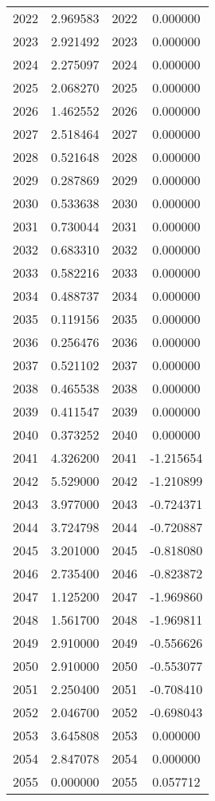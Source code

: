 \documentclass[12pt]{article}
\begin{document}
\begin{longtable}{@{}cccc@{}}
2022 & 2.969583 & 2022 & 0.000000 \\
2023 & 2.921492 & 2023 & 0.000000 \\
2024 & 2.275097 & 2024 & 0.000000 \\
2025 & 2.068270 & 2025 & 0.000000 \\
2026 & 1.462552 & 2026 & 0.000000 \\
2027 & 2.518464 & 2027 & 0.000000 \\
2028 & 0.521648 & 2028 & 0.000000 \\
2029 & 0.287869 & 2029 & 0.000000 \\
2030 & 0.533638 & 2030 & 0.000000 \\
2031 & 0.730044 & 2031 & 0.000000 \\
2032 & 0.683310 & 2032 & 0.000000 \\
2033 & 0.582216 & 2033 & 0.000000 \\
2034 & 0.488737 & 2034 & 0.000000 \\
2035 & 0.119156 & 2035 & 0.000000 \\
2036 & 0.256476 & 2036 & 0.000000 \\
2037 & 0.521102 & 2037 & 0.000000 \\
2038 & 0.465538 & 2038 & 0.000000 \\
2039 & 0.411547 & 2039 & 0.000000 \\
2040 & 0.373252 & 2040 & 0.000000 \\
2041 & 4.326200 & 2041 & -1.215654 \\
2042 & 5.529000 & 2042 & -1.210899 \\
2043 & 3.977000 & 2043 & -0.724371 \\
2044 & 3.724798 & 2044 & -0.720887 \\
2045 & 3.201000 & 2045 & -0.818080 \\
2046 & 2.735400 & 2046 & -0.823872 \\
2047 & 1.125200 & 2047 & -1.969860 \\
2048 & 1.561700 & 2048 & -1.969811 \\
2049 & 2.910000 & 2049 & -0.556626 \\
2050 & 2.910000 & 2050 & -0.553077 \\
2051 & 2.250400 & 2051 & -0.708410 \\
2052 & 2.046700 & 2052 & -0.698043 \\
2053 & 3.645808 & 2053 & 0.000000 \\
2054 & 2.847078 & 2054 & 0.000000 \\
2055 & 0.000000 & 2055 & 0.057712 \\

\end{longtable}
\end{document}
